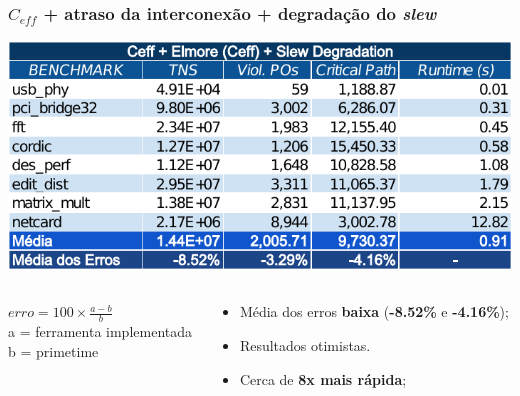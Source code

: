\documentclass[10pt,a4paper]{beamer}
\begin{document}
		
		\begin{frame}[t]
			\frametitle{$C_{eff}$ + atraso da interconexão + degradação do \textit{slew}}
			\vspace{-.5cm}
			\begin{center}
				\includegraphics[width=0.9\linewidth]{img/ceff_elmore_slew.pdf}
			\end{center}
			\vspace{-.5cm}
			\begin{columns}
				\begin{column}{0.4\textwidth}
					\begin{shaded}
						$erro = 100 \times \frac{a - b}{ b } $ \\
						\small{a = ferramenta implementada} \\
						\small{b = primetime}
					\end{shaded}
				\end{column}
				\begin{column}{0.6\textwidth}
					\begin{itemize}
						\item Média dos erros \textbf{baixa} (\textbf{-8.52\%} e \textbf{-4.16\%});
						\item Resultados otimistas.
						\item Cerca de \textbf{8x mais rápida};
					\end{itemize}
				\end{column}
			\end{columns}			
			
		\end{frame}
		
\end{document}
